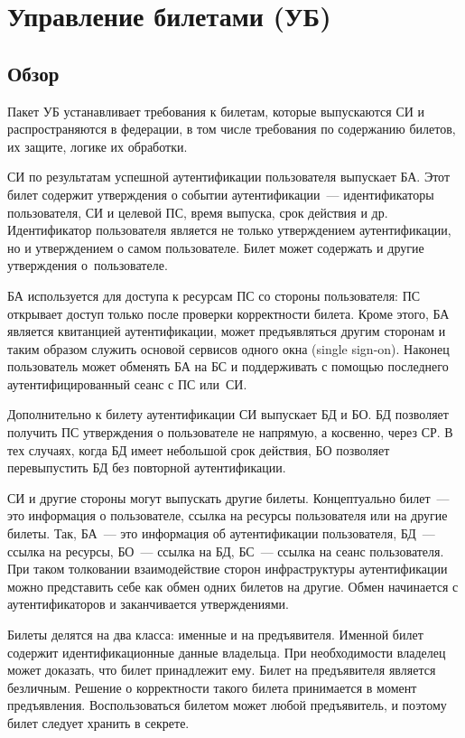 \section{Управление билетами (УБ)}\label{TM}

\subsection{Обзор}\label{TM.Intro}

Пакет УБ устанавливает требования к билетам, которые выпускаются СИ и 
распространяются в федерации, в том числе требования по содержанию билетов,
их защите, логике их обработки. 

СИ по результатам успешной аутентификации пользователя выпускает БА.
Этот билет содержит утверждения о событии аутентификации~---
идентификаторы пользователя, СИ и целевой ПС, время выпуска, 
срок действия и др.  
%
Идентификатор пользователя является не только утверждением аутентификации,
но и утверждением о самом пользователе.
Билет может содержать и другие утверждения о~пользователе.

БА используется для доступа к ресурсам ПС со стороны пользователя:
ПС открывает доступ только после проверки корректности билета.
%
Кроме этого, БА является квитанцией аутентификации, может предъявляться другим
сторонам и таким образом служить основой сервисов одного окна (single
sign-on).
%
Наконец пользователь может обменять БА на БС и поддерживать с помощью 
последнего аутентифицированный сеанс с ПС или~СИ. 

Дополнительно к билету аутентификации СИ выпускает БД и БО.
БД позволяет получить ПС утверждения о пользователе не напрямую,
а косвенно, через СР. В тех случаях, когда БД имеет небольшой срок 
действия, БО позволяет перевыпустить БД без повторной аутентификации. 

СИ и другие стороны могут выпускать другие билеты. 
%
Концептуально билет~--- это информация о пользователе, 
ссылка на ресурсы пользователя или на другие билеты. 
Так, БА~--- это информация об аутентификации пользователя, 
БД~--- ссылка на ресурсы, 
БО~--- ссылка на БД, 
БС~--- ссылка на сеанс пользователя.
%
При таком толковании взаимодействие сторон инфраструктуры аутентификации 
можно представить себе как обмен одних билетов на другие.
%
Обмен начинается с аутентификаторов и заканчивается утверждениями.

Билеты делятся на два класса: именные и на предъявителя.
Именной билет содержит идентификационные данные владельца.
При необходимости владелец может доказать, что билет принадлежит ему.
Билет на предъявителя является безличным. 
Решение о корректности такого билета принимается в момент предъявления.
Воспользоваться билетом может любой предъявитель, и поэтому билет 
следует хранить в секрете.

